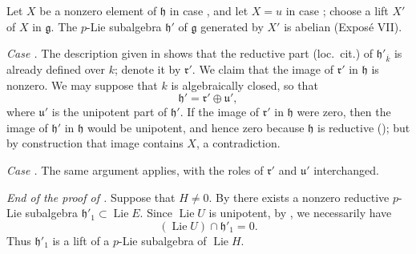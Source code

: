 
Let \(X\) be a nonzero element of \(\mathfrak h\) in case , and
let \(X=u\) in case ; choose a lift \(X'\) of \(X\) in
\(\mathfrak g\).  The \(p\)-Lie subalgebra \(\mathfrak h'\) of
\(\mathfrak g\) generated by \(X'\) is abelian (Exposé VII).

\smallskip
\noindent
\emph{Case .}
The description given in  shows that the reductive part
(loc.\ cit.) of \(\mathfrak h'_{\overline{k}}\) is already defined
over \(k\); denote it by \(\mathfrak r'\).  We claim that the image
of \(\mathfrak r'\) in \(\mathfrak h\) is nonzero.  We may suppose
that \(k\) is algebraically closed, so that
\[
  \mathfrak h'=\mathfrak r'\oplus\mathfrak u',
\]
where \(\mathfrak u'\) is the unipotent part of
\(\mathfrak h'\).  If the image of \(\mathfrak r'\) in
\(\mathfrak h\) were zero, then the image of \(\mathfrak h'\) in
\(\mathfrak h\) would be unipotent, and hence zero because
\(\mathfrak h\) is reductive (); but by construction that
image contains \(X\), a contradiction.

\smallskip
\noindent
\emph{Case .}
The same argument applies, with the roles of \(\mathfrak r'\) and
\(\mathfrak u'\) interchanged.

\smallskip
\noindent
\emph{End of the proof of .}
Suppose that \(H\ne0\).  By  there exists a nonzero reductive
\(p\)-Lie subalgebra
\(\mathfrak h'_1\subset\operatorname{Lie}E\).  Since
\(\operatorname{Lie}U\) is unipotent, by , we necessarily
have
\[
  (\operatorname{Lie}U)\cap\mathfrak h'_1=0.
\]
Thus \(\mathfrak h'_1\) is a lift of a \(p\)-Lie subalgebra of
\(\operatorname{Lie}H\).

